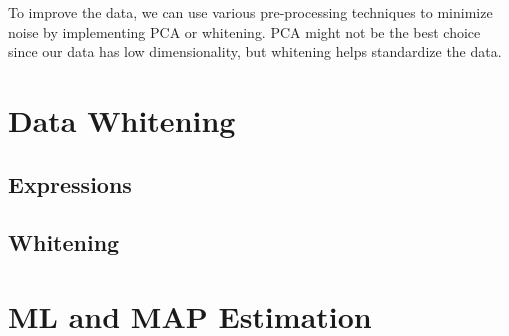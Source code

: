 \documentclass{article}
\begin{document}
To improve the data, we can use various pre-processing techniques to minimize noise by implementing PCA or whitening. PCA might not be the best choice since our data has low dimensionality, but whitening helps standardize the data. 

\newpage
\section{Data Whitening}

\subsection{Expressions}
\subsection{Whitening}

\newpage
\section{ML and MAP Estimation}

\subsection{}
\subsection{}
\subsection{}
\end{document}
